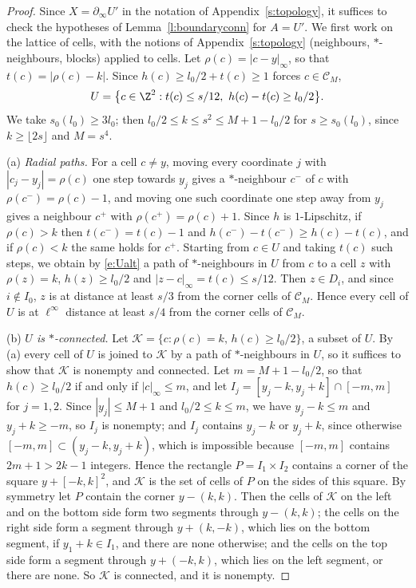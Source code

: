 \begin{proof}
Since $X = \partial_\infty U'$ in the notation of Appendix~\ref{s:topology}, it suffices to check the hypotheses of Lemma~\ref{l:boundaryconn} for $A = U'$. We first work on the lattice of cells, with the notions of Appendix~\ref{s:topology} (neighbours, $*$-neighbours, blocks) applied to cells. Let $\rho(c) = |c - y|_\infty$, so that $t(c) = |\rho(c) - k|$. Since $h(c) \ge l_0/2 + t(c) \ge 1$ forces $c \in \mathcal C_M$,
\begin{equation}\label{e:Ualt}
U = \bigl\{ c \in \Z^2 : t(c) \le s/12, \ h(c) - t(c) \ge l_0/2 \bigr\} .
\end{equation}
We take $s_0(l_0) \ge 3 l_0$; then $l_0/2 \le k \le s^2 \le M + 1 - l_0/2$ for $s \ge s_0(l_0)$, since $k \ge \lfloor 2 s \rfloor$ and $M = s^4$.

(a) \emph{Radial paths.} For a cell $c \neq y$, moving every coordinate $j$ with $|c_j - y_j| = \rho(c)$ one step towards $y_j$ gives a $*$-neighbour $c^-$ of $c$ with $\rho(c^-) = \rho(c) - 1$, and moving one such coordinate one step away from $y_j$ gives a neighbour $c^+$ with $\rho(c^+) = \rho(c) + 1$. Since $h$ is $1$-Lipschitz, if $\rho(c) > k$ then $t(c^-) = t(c) - 1$ and $h(c^-) - t(c^-) \ge h(c) - t(c)$, and if $\rho(c) < k$ the same holds for $c^+$. Starting from $c \in U$ and taking $t(c)$ such steps, we obtain by \eqref{e:Ualt} a path of $*$-neighbours in $U$ from $c$ to a cell $z$ with $\rho(z) = k$, $h(z) \ge l_0/2$ and $|z - c|_\infty = t(c) \le s/12$. Then $z \in D_i$, and since $i \notin I_0$, $z$ is at distance at least $s/3$ from the corner cells of $\mathcal C_M$. Hence every cell of $U$ is at $\ell^\infty$ distance at least $s/4$ from the corner cells of $\mathcal C_M$.

(b) \emph{$U$ is $*$-connected.} Let $\mathcal K = \{ c : \rho(c) = k, \, h(c) \ge l_0/2 \}$, a subset of $U$. By (a) every cell of $U$ is joined to $\mathcal K$ by a path of $*$-neighbours in $U$, so it suffices to show that $\mathcal K$ is nonempty and connected. Let $m = M + 1 - l_0/2$, so that $h(c) \ge l_0/2$ if and only if $|c|_\infty \le m$, and let $I_j = [y_j - k, y_j + k] \cap [-m, m]$ for $j = 1, 2$. Since $|y_j| \le M + 1$ and $l_0/2 \le k \le m$, we have $y_j - k \le m$ and $y_j + k \ge -m$, so $I_j$ is nonempty; and $I_j$ contains $y_j - k$ or $y_j + k$, since otherwise $[-m, m] \subset (y_j - k, y_j + k)$, which is impossible because $[-m, m]$ contains $2m + 1 > 2k - 1$ integers. Hence the rectangle $P = I_1 \times I_2$ contains a corner of the square $y + [-k, k]^2$, and $\mathcal K$ is the set of cells of $P$ on the sides of this square. By symmetry let $P$ contain the corner $y - (k, k)$. Then the cells of $\mathcal K$ on the left and on the bottom side form two segments through $y - (k, k)$; the cells on the right side form a segment through $y + (k, -k)$, which lies on the bottom segment, if $y_1 + k \in I_1$, and there are none otherwise; and the cells on the top side form a segment through $y + (-k, k)$, which lies on the left segment, or there are none. So $\mathcal K$ is connected, and it is nonempty.


\end{proof}
